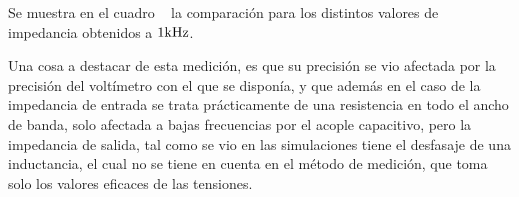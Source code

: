 Se muestra en el cuadro ~ la comparación para los distintos valores de impedancia obtenidos a $1 \si[per-mode=symbol]{\kilo\hertz}$.


\begin{table}[H]  %
    
    \setlength\arrayrulewidth{1.5pt}
    \def\clinecolor{\hhline{|>{\arrayrulecolor{white}}-%
    >{\arrayrulecolor{white}}|-|-|-|-|}}
    
\begin{center}  
    \caption{Comparación de impedancias de entrada y salida (a 1 \si[per-mode=symbol]{\kilo\hertz}).}
    \label{tab:comp_impedance}
	\end{center}
\end{table}

Una cosa a destacar de esta medición, es que su precisión se vio afectada por la precisión del voltímetro con el que se disponía, y que además en el caso de la impedancia de entrada se trata prácticamente de una resistencia en todo el ancho de banda, solo afectada a bajas frecuencias por el acople capacitivo, pero la impedancia de salida, tal como se vio en las simulaciones tiene el desfasaje de una inductancia, el cual no se tiene en cuenta en el método de medición, que toma solo los valores eficaces de las tensiones.

